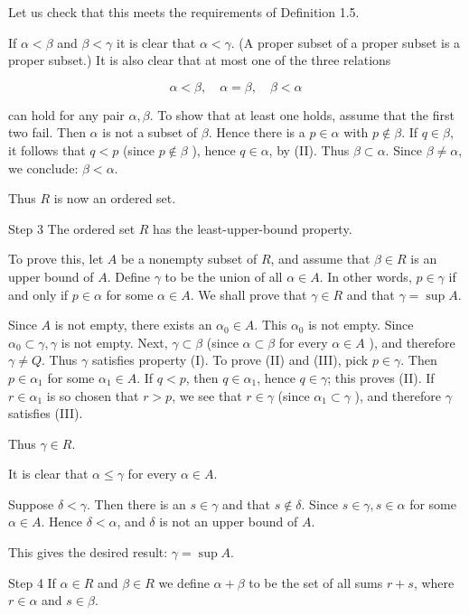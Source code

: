 \documentclass[10pt]{article}
\begin{document}
Let us check that this meets the requirements of Definition 1.5.

If $\alpha<\beta$ and $\beta<\gamma$ it is clear that $\alpha<\gamma$. (A proper subset of a proper subset is a proper subset.) It is also clear that at most one of the three relations

$$
\alpha<\beta, \quad \alpha=\beta, \quad \beta<\alpha
$$

can hold for any pair $\alpha, \beta$. To show that at least one holds, assume that the first two fail. Then $\alpha$ is not a subset of $\beta$. Hence there is a $p \in \alpha$ with $p \notin \beta$. If $q \in \beta$, it follows that $q<p$ (since $p \notin \beta$ ), hence $q \in \alpha$, by (II). Thus $\beta \subset \alpha$. Since $\beta \neq \alpha$, we conclude: $\beta<\alpha$.

Thus $R$ is now an ordered set.

Step 3 The ordered set $R$ has the least-upper-bound property.

To prove this, let $A$ be a nonempty subset of $R$, and assume that $\beta \in R$ is an upper bound of $A$. Define $\gamma$ to be the union of all $\alpha \in A$. In other words, $p \in \gamma$ if and only if $p \in \alpha$ for some $\alpha \in A$. We shall prove that $\gamma \in R$ and that $\gamma=\sup A$.

Since $A$ is not empty, there exists an $\alpha_{0} \in A$. This $\alpha_{0}$ is not empty. Since $\alpha_{0} \subset \gamma, \gamma$ is not empty. Next, $\gamma \subset \beta$ (since $\alpha \subset \beta$ for every $\alpha \in A$ ), and therefore $\gamma \neq Q$. Thus $\gamma$ satisfies property (I). To prove (II) and (III), pick $p \in \gamma$. Then $p \in \alpha_{1}$ for some $\alpha_{1} \in A$. If $q<p$, then $q \in \alpha_{1}$, hence $q \in \gamma$; this proves (II). If $r \in \alpha_{1}$ is so chosen that $r>p$, we see that $r \in \gamma$ (since $\alpha_{1} \subset \gamma$ ), and therefore $\gamma$ satisfies (III).

Thus $\gamma \in R$.

It is clear that $\alpha \leq \gamma$ for every $\alpha \in A$.

Suppose $\delta<\gamma$. Then there is an $s \in \gamma$ and that $s \notin \delta$. Since $s \in \gamma, s \in \alpha$ for some $\alpha \in A$. Hence $\delta<\alpha$, and $\delta$ is not an upper bound of $A$.

This gives the desired result: $\gamma=\sup A$.

Step 4 If $\alpha \in R$ and $\beta \in R$ we define $\alpha+\beta$ to be the set of all sums $r+s$, where $r \in \alpha$ and $s \in \beta$.
\end{document}
